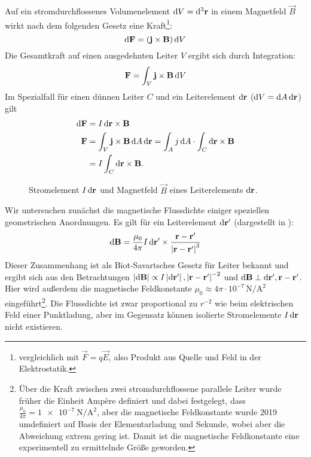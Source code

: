 Auf ein stromdurchflossenes Volumenelement $\mathop{}\!\mathrm{d} V=\mathop{}\!\mathrm{d}^3 \mathbf{r}$ in einem Magnetfeld $\vec B$ wirkt nach dem folgenden Gesetz eine Kraft\footnote{vergleichlich mit $\vec {F}=q\vec {E}$, also Produkt aus Quelle und Feld in der Elektrostatik. }:
\begin{equation*}
	\mathop{}\!\mathrm{d} \mathbf{F}=(\mathbf{j}\times\mathbf{B})\mathop{}\!\mathrm{d} V
\end{equation*}
Die Gesamtkraft auf einen ausgedehnten Leiter $V$ ergibt sich durch Integration:
\begin{equation*}
	\mathbf{F}=\int _{V}\mathbf{j}\times \mathbf{B}\mathop{}\!\mathrm{d} V
\end{equation*}
Im Spezialfall für einen dünnen Leiter $C$ und ein Leiterelement $\mathop{}\!\mathrm{d}\mathbf{r}$ ($\mathop{}\!\mathrm{d} V = \mathop{}\!\mathrm{d} A\mathop{}\!\mathrm{d}\mathbf{r}$) gilt
\begin{align}
	\label{eq:def_magn_flussdichte}
	\mathop{}\!\mathrm{d} \mathbf{F} & =I\mathop{}\!\mathrm{d}\mathbf{r}\times\mathbf{B}                                                                                               \\
	\mathbf{F}     & =\int _{V}\mathbf{j}\times \mathbf{B}\mathop{}\!\mathrm{d} A \mathop{}\!\mathrm{d}\mathbf{r} = \int_{A}j\mathop{}\!\mathrm{d} A \cdot \int_C \mathop{}\!\mathrm{d}\mathbf{r}\times \mathbf{B} \nonumber \\& = I\int_C \mathop{}\!\mathrm{d}\mathbf{r}\times \mathbf{B} .\nonumber
\end{align}

\begin{figure}[htb]
	\centering
	\tfigMagneticFieldAtAConductor
	\caption{Stromelement $I\mathop{}\!\mathrm{d}\mathbf{r}$ und Magnetfeld $\vec B$ eines Leiterelements $\mathop{}\!\mathrm{d} \mathbf{r}$. }
	\label{fig:magnetic_field_conductor_diff_view}
\end{figure}
Wir untersuchen zunächst die magnetische Flussdichte einiger speziellen geometrischen Anordnungen. Es gilt für ein Leiterelement $\mathop{}\!\mathrm{d} \mathbf{r}'$ (dargestellt in ):
\begin{equation}
	\label{eq:biot_savart_leiter_differentiell}
	\mathop{}\!\mathrm{d} \mathbf{B}=\frac{\mu _{0}}{4\pi }I\mathop{}\!\mathrm{d} \mathbf{r}'\times \frac{\mathbf{r}-\mathbf{r}'}{\left| \mathbf{r}-\mathbf{r}'\right| ^{3}}
\end{equation}
Dieser Zusammenhang ist als Biot-Savartsches Gesetz für Leiter bekannt und ergibt sich aus den Betrachtungen $\left| \mathop{}\!\mathrm{d} \mathbf{B}\right| \propto I\left| \mathop{}\!\mathrm{d} \mathbf{r}'\right| , \left| \mathbf{r}-\mathbf{r}'\right| ^{-2}$ und $\mathop{}\!\mathrm{d} \mathbf{B}\perp \mathop{}\!\mathrm{d} \mathbf{r}',\mathbf{r}-\mathbf{r}'$. Hier wird außerdem die magnetische Feldkonstante $\mu _{0}\approx 4\pi \cdot 10^{-7}\,\si{\newton\per\square\ampere}$ eingeführt\footnote{Über die Kraft zwischen zwei stromdurchflossene parallele Leiter wurde früher die Einheit Ampère definiert und dabei festgelegt, dass $\frac{\mu _{0}}{4\pi }=\SI{1e-7}{\newton\per\square\ampere}$, aber die magnetische Feldkonstante wurde 2019 umdefiniert auf Basis der Elementarladung und Sekunde, wobei aber die Abweichung extrem gering ist. Damit ist die magnetische Feldkonstante eine experimentell zu ermittelnde Größe geworden. }. Die Flussdichte ist zwar proportional zu $r^{-2}$ wie beim elektrischen Feld einer Punktladung, aber im Gegensatz können isolierte Stromelemente $I\mathop{}\!\mathrm{d} \mathbf{r}$ nicht existieren.

